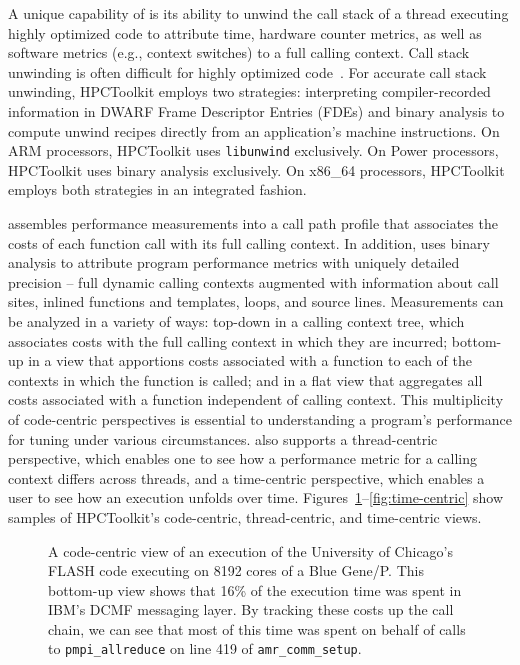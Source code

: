 \documentclass[11pt,letterpaper]{report}
\begin{document}
A unique capability of \HPCToolkit{} is its ability to unwind the call stack of a thread executing highly optimized code to attribute time, hardware counter metrics, as well as software metrics (e.g., context switches) to a full calling context.
Call stack unwinding is often difficult for highly optimized code~\cite{Tallent-MC-Fagan:2009:PLDI-hpctoolkit-binary-analysis}. For accurate call stack unwinding, HPCToolkit employs two strategies:
interpreting compiler-recorded information in DWARF Frame Descriptor Entries (FDEs) and binary analysis
to compute unwind recipes directly from an application's  machine instructions.
On ARM processors, HPCToolkit uses {\tt libunwind} exclusively. On Power processors, HPCToolkit uses
binary analysis exclusively.
On x86\_64 processors, HPCToolkit employs both strategies in an integrated fashion.

\HPCToolkit{} assembles performance measurements into a call path profile that associates the costs of each function call with its full calling context.
In addition, \HPCToolkit{} uses binary analysis to attribute program performance metrics with uniquely detailed precision -- full dynamic calling contexts augmented with information about call sites, inlined functions and templates, loops, and source lines.
Measurements can be analyzed in a variety of ways: top-down in a calling context tree, which associates costs with the full calling context in which they are incurred; bottom-up in a view that apportions costs associated with a function to each of the contexts in which the function is called; and in a flat view that aggregates all costs associated with a function independent of calling context.
This multiplicity of code-centric perspectives is essential to understanding a program's performance for tuning under various circumstances.
\HPCToolkit{} also supports a thread-centric perspective, which enables one to see how a performance metric for a calling context differs across threads, and a time-centric perspective, which enables a user to see how an execution unfolds over time. Figures~\ref{fig:code-centric}--\ref{fig:time-centric} show samples of HPCToolkit's code-centric, thread-centric, and time-centric views.


\begin{figure}[t]
\caption{A code-centric view of an execution of the University of Chicago's FLASH code executing on 8192 cores of a Blue Gene/P. This bottom-up view shows that 16\% of the execution time was spent in IBM's DCMF messaging layer. By tracking these costs up the call chain, we can see that most of this time   was spent on behalf of calls to {\tt pmpi\_allreduce} on line 419 of {\tt amr\_comm\_setup}.}
\label{fig:code-centric}
\end{figure}
\end{document}
